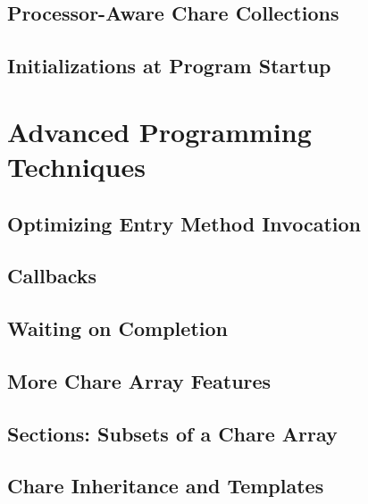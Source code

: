 \documentclass[10pt]{report}
\begin{document}
\chapter{Processor-Aware Chare Collections}
  
  

\chapter{Initializations at Program Startup}
  

\part{Advanced Programming Techniques}

\chapter{Optimizing Entry Method Invocation}
  
  
  

\chapter{Callbacks}
  

\chapter{Waiting on Completion}
  
  
  
  

\chapter{More Chare Array Features}
\label{advanced arrays}
  

\chapter{Sections: Subsets of a Chare Array}
\label{array section}
  

\chapter{Chare Inheritance and Templates}
\label{inheritance and templates}
  
\end{document}
